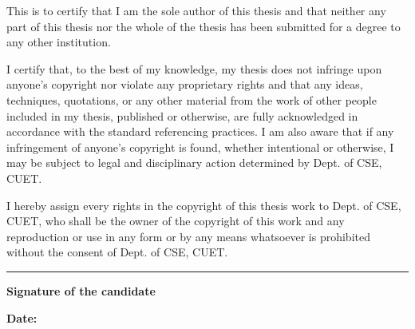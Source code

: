 \begin{declaration}

\hspace{4em}This is to certify that I am the sole author of this thesis and that neither any part of this thesis nor the whole of the thesis has been submitted for a degree to any other institution.

\hspace{4em}I certify that, to the best of my knowledge, my thesis does not infringe upon anyone's copyright nor violate any proprietary rights and that any ideas, techniques, quotations, or any other material from the work of other people included in my thesis, published or otherwise, are fully acknowledged in accordance with the standard referencing practices. I am also aware that if any infringement of anyone's copyright is found, whether intentional or otherwise, I may be subject to legal and disciplinary action determined by Dept. of CSE, CUET.

\hspace{4em}I hereby assign every rights in the copyright of this thesis work to Dept. of CSE, CUET, who shall be the owner of the copyright of this work and any reproduction or use in any form or by any means whatsoever is prohibited without the consent of Dept. of CSE, CUET.

\vspace{5em}
\rule[0.5em]{25em}{0.5pt}
\par\textbf{Signature of the candidate}
\par\textbf{Date: }

\end{declaration}